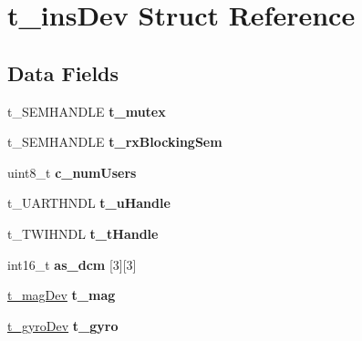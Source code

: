\hypertarget{structt__ins_dev}{\section{t\-\_\-ins\-Dev Struct Reference}
\label{structt__ins_dev}
}
\subsection*{Data Fields}
\begin{DoxyCompactItemize}
\item 
\hypertarget{structt__ins_dev_ab0543e5662ae0b4ef5014d2c76ab248d}{t\-\_\-\-S\-E\-M\-H\-A\-N\-D\-L\-E {\bfseries t\-\_\-mutex}}\label{structt__ins_dev_ab0543e5662ae0b4ef5014d2c76ab248d}

\item 
\hypertarget{structt__ins_dev_aedc039854e5cfc913eb025a5b4d8e744}{t\-\_\-\-S\-E\-M\-H\-A\-N\-D\-L\-E {\bfseries t\-\_\-rx\-Blocking\-Sem}}\label{structt__ins_dev_aedc039854e5cfc913eb025a5b4d8e744}

\item 
\hypertarget{structt__ins_dev_a65907c8d88006e5cdc5e6b18eb4606ba}{uint8\-\_\-t {\bfseries c\-\_\-num\-Users}}\label{structt__ins_dev_a65907c8d88006e5cdc5e6b18eb4606ba}

\item 
\hypertarget{structt__ins_dev_adff9fcc9b301fd4d7521fb37d7490034}{t\-\_\-\-U\-A\-R\-T\-H\-N\-D\-L {\bfseries t\-\_\-u\-Handle}}\label{structt__ins_dev_adff9fcc9b301fd4d7521fb37d7490034}

\item 
\hypertarget{structt__ins_dev_a33eb013cd6697c0479ee83eb11f56759}{t\-\_\-\-T\-W\-I\-H\-N\-D\-L {\bfseries t\-\_\-t\-Handle}}\label{structt__ins_dev_a33eb013cd6697c0479ee83eb11f56759}

\item 
\hypertarget{structt__ins_dev_ad592a17f11c5551978cd730f777e2fda}{int16\-\_\-t {\bfseries as\-\_\-dcm} \mbox{[}3\mbox{]}\mbox{[}3\mbox{]}}\label{structt__ins_dev_ad592a17f11c5551978cd730f777e2fda}

\item 
\hypertarget{structt__ins_dev_a233dcaece43725fbf088c57ef011132c}{\hyperlink{structt__mag_dev}{t\-\_\-mag\-Dev} {\bfseries t\-\_\-mag}}\label{structt__ins_dev_a233dcaece43725fbf088c57ef011132c}

\item 
\hypertarget{structt__ins_dev_a68f65e935d224cc7190cdc859faa4192}{\hyperlink{structt__gyro_dev}{t\-\_\-gyro\-Dev} {\bfseries t\-\_\-gyro}}\label{structt__ins_dev_a68f65e935d224cc7190cdc859faa4192}


\end{DoxyCompactItemize}
